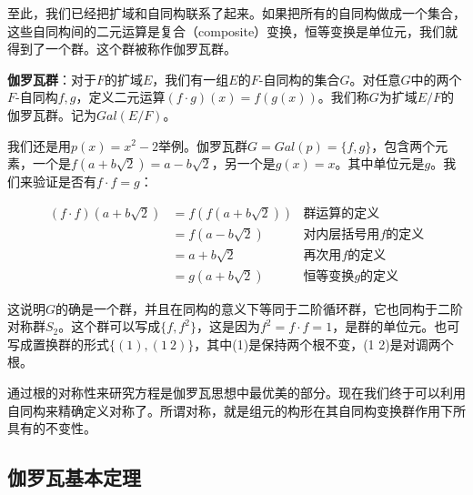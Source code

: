 \documentclass[b5paper]{ctexart}
\begin{document}
至此，我们已经把扩域和自同构联系了起来。如果把所有的自同构做成一个集合，这些自同构间的二元运算是复合（composite）变换，恒等变换是单位元，我们就得到了一个群。这个群被称作伽罗瓦群。

\begin{definition}
\textbf{伽罗瓦群}：对于$F$的扩域$E$，我们有一组$E$的$F$-自同构的集合$G$。对任意$G$中的两个$F$-自同构$f, g$，定义二元运算$(f \cdot g)(x) = f(g(x))$。我们称$G$为扩域$E/F$的伽罗瓦群。记为$Gal(E/F)$。
\end{definition}

我们还是用$p(x) = x^2 - 2$举例。伽罗瓦群$G = Gal(p) = \{f, g\}$，包含两个元素，一个是$f(a + b\sqrt{2}) = a - b\sqrt{2}$，另一个是$g(x) = x$。其中单位元是$g$。我们来验证是否有$f \cdot f = g$：

\[
\begin{array}{rll}
(f \cdot f)(a + b\sqrt{2}) & = f(f(a + b\sqrt{2})) & \text{群运算的定义} \\
  & = f(a - b\sqrt{2}) & \text{对内层括号用$f$的定义} \\
  & = a + b\sqrt{2} & \text{再次用$f$的定义} \\
  & = g(a + b\sqrt{2}) & \text{恒等变换$g$的定义}
\end{array}
\]

这说明$G$的确是一个群，并且在同构的意义下等同于二阶循环群，它也同构于二阶对称群$S_2$。这个群可以写成$\{f, f^2\}$，这是因为$f^2 = f \cdot f = 1$，是群的单位元。也可写成置换群的形式$\{(1), (1\ 2)\}$，其中(1)是保持两个根不变，(1 2)是对调两个根。

\begin{mdframed}
通过根的对称性来研究方程是伽罗瓦思想中最优美的部分。现在我们终于可以利用自同构来精确定义对称了。所谓对称，就是组元的构形在其自同构变换群作用下所具有的不变性。
\end{mdframed}

\begin{Exercise}
\end{Exercise}

\subsection{伽罗瓦基本定理}
\end{document}

